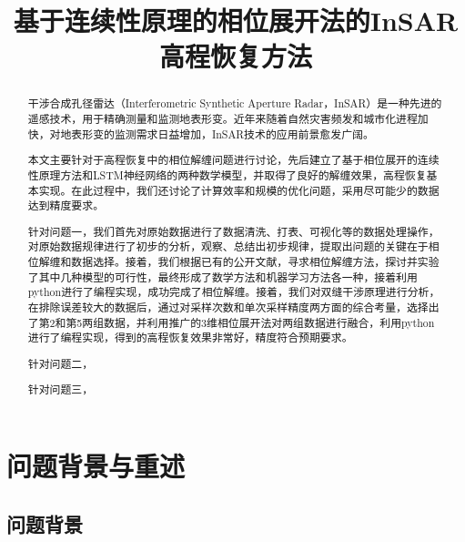 \documentclass[a4paper]{article}
\title{\textbf{基于连续性原理的相位展开法的InSAR高程恢复方法}}
\date{} %
\begin{document}
	\maketitle
	\vspace{-6em} %
	\begin{abstract}

		干涉合成孔径雷达（Interferometric Synthetic Aperture Radar，InSAR）是一种先进的遥感技术，用于精确测量和监测地表形变。近年来随着自然灾害频发和城市化进程加快，对地表形变的监测需求日益增加，InSAR技术的应用前景愈发广阔。\par
		本文主要针对于高程恢复中的相位解缠问题进行讨论，先后建立了基于相位展开的连续性原理方法和LSTM神经网络的两种数学模型，并取得了良好的解缠效果，高程恢复基本实现。在此过程中，我们还讨论了计算效率和规模的优化问题，采用尽可能少的数据达到精度要求。\par
		针对问题一，我们首先对原始数据进行了数据清洗、打表、可视化等的数据处理操作，对原始数据规律进行了初步的分析，观察、总结出初步规律，提取出问题的关键在于相位解缠和数据选择。接着，我们根据已有的公开文献，寻求相位解缠方法，探讨并实验了其中几种模型的可行性，最终形成了数学方法和机器学习方法各一种，接着利用python进行了编程实现，成功完成了相位解缠。接着，我们对双缝干涉原理进行分析，在排除误差较大的数据后，通过对采样次数和单次采样精度两方面的综合考量，选择出了第2和第5两组数据，并利用推广的3维相位展开法对两组数据进行融合，利用python进行了编程实现，得到的高程恢复效果非常好，精度符合预期要求。\par
		针对问题二，\par
		针对问题三，\\
		\newline
	\end{abstract}
	
	\clearpage %
	
	\section{问题背景与重述}
	\subsection{问题背景}
\end{document}
